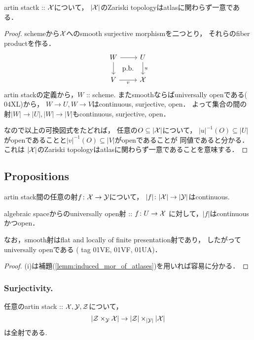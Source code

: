 \begin{Lemma}
    artin stactk :: $\mathcal{X}$について，
    $|\mathcal{X}|$のZariski topologyはatlasに関わらず一意である．
\end{Lemma}
\begin{proof}
    schemeから$\mathcal{X}$へのsmooth surjective morphismを二つとり，
    それらのfiber productを作る．
    \[
    \begin{tikzcd}
        W \ar[r]\ar[d]& U \ar[d, "u"]\\
        V \ar[r, "v"']& \stX \ar[lu, phantom, "\text{p.b.}"]
    \end{tikzcd}
    \]
    artin stackの定義から，$W$ :: scheme.
    またsmoothならばuniversally openである(\cite{SP} 04XL)から，
    $W \to U, W \to V$はcontinuous, surjective, open．
    よって集合の間の射$|W| \to |U|, |W| \to |V|$もcontinuous, surjective, open．

    なので以上の可換図式をたどれば，
    任意の$O \subseteq |\mathcal{X}|$について，
    $|u|^{-1}(O) \subseteq |U|$がopenであることと$|v|^{-1}(O) \subseteq |V|$がopenであることが
    同値であると分かる．
    これは
    $|\mathcal{X}|$のZariski topologyはatlasに関わらず一意であることを意味する．
\end{proof}

\subsection{Propositions}

\begin{Prop}[\cite{SP} 04XL]
\begin{myenum}
    \item
        artin stack間の任意の射$f \colon \mathcal{X} \to \mathcal{Y}$について，
        $|f| \colon |\mathcal{X}| \to |\mathcal{Y}|$はcontinuous.
    \item
        algebraic spaceからのuniversally open射 :: $f \colon U \to \mathcal{X}$
        に対して，$|f|$はcontinuousかつopen．
\end{myenum}
    なお，smooth射はflat and locally of finite presentation射であり，
    したがってuniversally openである
    (\cite{SP} tag 01VE, 01VF, 01UA)．
\end{Prop}
\begin{proof}
    (i)は補題(\ref{lemm:induced_mor_of_atlases})を用いれば容易に分かる．
\end{proof}

\subsubsection{Surjectivity.}
\begin{Lemma}
    任意のartin stack :: $\mathcal{X}, \mathcal{Y}, \mathcal{Z}$について，
    \[ |\mathcal{Z} \times_{\mathcal{Y}} \mathcal{X}| \to |\mathcal{Z}| \times _{|\mathcal{Y}|} |\mathcal{X}| \]
    は全射である.
\end{Lemma}

